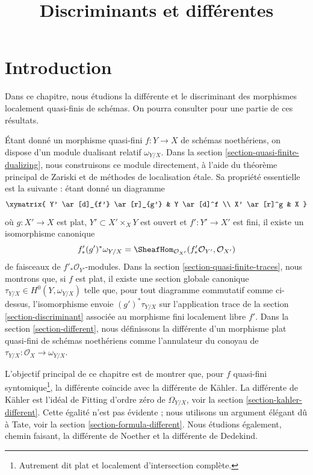 

%


\title{Discriminants et différentes}


\maketitle

\label{section-phantom}

\tableofcontents

\section{Introduction}
\label{section-introduction}

\noindent
Dans ce chapitre, nous étudions la différente et le discriminant
des morphismes localement quasi-finis de schémas.
On pourra consulter \cite{Kunz} pour une partie de ces résultats.

\medskip\noindent
Étant donné un morphisme quasi-fini $f : Y \to X$ de schémas noethériens,
on dispose d'un module dualisant relatif $\omega_{Y/X}$.
Dans la section \ref{section-quasi-finite-dualizing},
nous construisons ce module directement, à l'aide
du théorème principal de Zariski et de méthodes de localisation étale.
Sa propriété essentielle est la suivante : étant donné un diagramme
$$
\xymatrix{
Y' \ar[d]_{f'} \ar[r]_{g'} & Y \ar[d]^f \\
X' \ar[r]^g & X
}
$$
où $g : X' \to X$ est plat, $Y' \subset X' \times_X Y$ est ouvert et
$f' : Y' \to X'$ est fini, il existe un isomorphisme canonique
$$
f'_*(g')^*\omega_{Y/X} =
\SheafHom_{\mathcal{O}_{X'}}(f'_*\mathcal{O}_{Y'}, \mathcal{O}_{X'})
$$
de faisceaux de $f'_*\mathcal{O}_{Y'}$-modules. Dans la
section \ref{section-quasi-finite-traces}, nous montrons que,
si $f$ est plat, il existe une section globale canonique
$\tau_{Y/X} \in H^0(Y, \omega_{Y/X})$ telle que, pour tout diagramme
commutatif comme ci-dessus, l'isomorphisme envoie $(g')^*\tau_{Y/X}$ sur l'application trace
de la section \ref{section-discriminant}
associée au morphisme fini localement libre $f'$.
Dans la section \ref{section-different},
nous définissons la différente d'un morphisme plat quasi-fini
de schémas noethériens comme l'annulateur du
conoyau de $\tau_{Y/X} : \mathcal{O}_X \to \omega_{Y/X}$.

\medskip\noindent
L'objectif principal de ce chapitre est de montrer que, pour
$f$ quasi-fini syntomique\footnote{Autrement dit plat et localement d'intersection complète.}, la
différente coïncide avec la différente de Kähler.
La différente de Kähler est l'idéal de Fitting d'ordre zéro de $\Omega_{Y/X}$, voir
la section \ref{section-kahler-different}.
Cette égalité n'est pas évidente ; nous utilisons un argument élégant
dû à Tate, voir la section \ref{section-formula-different}.
Nous étudions également, chemin faisant, la différente de Noether
et la différente de Dedekind.

